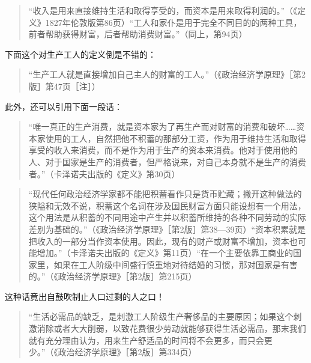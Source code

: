 \begin{quote}{“收入是用来直接维持生活和取得享受的，而资本是用来取得利润的。”（《定义》1827年伦敦版第86页）“工人和家仆是用于完全不同目的的两种工具，前者帮助获得财富，后者帮助消费财富。”（同上，第94页）}\end{quote}

下面这个对生产工人的定义倒是不错的：

\begin{quote}{“生产工人就是直接增加自己主人的财富的工人。”（《政治经济学原理》［第2版］第47页［注］）}\end{quote}

此外，还可以引用下面一段话：

\begin{quote}{“唯一真正的生产消费，就是资本家为了再生产而对财富的消费和破坏……资本家使用的工人，自然把他不积蓄的那部分工资，作为用于维持生活和取得享受的收入来消费，而不是作为用于生产的资本来消费。他对于使用他的人、对于国家是生产的消费者，但严格说来，对自己本身就不是生产的消费者。”（卡泽诺夫出版的《定义》第30页）}\end{quote}


\begin{quote}{“现代任何政治经济学家都不能把积蓄看作只是货币贮藏；撇开这种做法的狭隘和无效不说，积蓄这个名词在涉及国民财富方面只能设想有一个用法，这个用法是从积蓄的不同用途中产生并以积蓄所维持的各种不同劳动的实际差别为基础的。”（《政治经济学原理》［第2版］第38—39页）“资本积累就是把收入的一部分当作资本使用。因此，现有的财产或财富不增加，资本也可能增加。”（卡泽诺夫出版的《定义》第11页）“在一个主要依靠工商业的国家里，如果在工人阶级中间盛行慎重地对待结婚的习惯，那对国家是有害的。”（《政治经济学原理》［第2版］第215页）}\end{quote}

这种话竟出自鼓吹制止人口过剩的人之口！

\begin{quote}{“生活必需品的缺乏，是刺激工人阶级生产奢侈品的主要原因；如果这个刺激消除或者大大削弱，以致花费很少劳动就能够获得生活必需品，那末我们就有充分理由认为，用来生产舒适品的时间将不会更多，而只会更少。”（《政治经济学原理》［第2版］第334页）}\end{quote}

